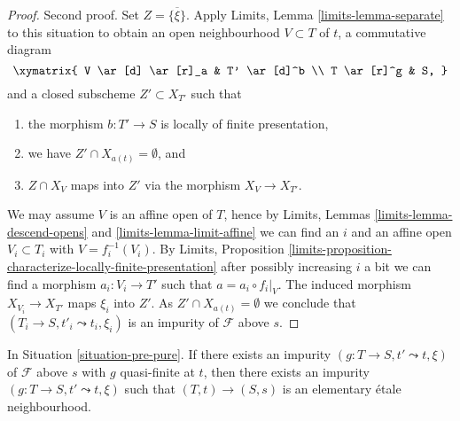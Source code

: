 \begin{proof}
\medskip\noindent
Second proof. Set $Z = \overline{\{\xi\}}$. Apply
Limits, Lemma \ref{limits-lemma-separate}
to this situation to obtain an open neighbourhood
$V \subset T$ of $t$, a commutative diagram
$$
\xymatrix{
V \ar[d] \ar[r]_a & T' \ar[d]^b \\
T \ar[r]^g & S,
}
$$
and a closed subscheme $Z' \subset X_{T'}$ such that
\begin{enumerate}
\item the morphism $b : T' \to S$ is locally of finite presentation,
\item we have $Z' \cap X_{a(t)} = \emptyset$, and
\item $Z \cap X_V$ maps into $Z'$ via the morphism $X_V \to X_{T'}$.
\end{enumerate}
We may assume $V$ is an affine open of $T$, hence by
Limits, Lemmas \ref{limits-lemma-descend-opens} and
\ref{limits-lemma-limit-affine}
we can find an $i$ and an affine open $V_i \subset T_i$ with
$V = f_i^{-1}(V_i)$. By
Limits,
Proposition \ref{limits-proposition-characterize-locally-finite-presentation}
after possibly increasing $i$ a bit we can find a morphism
$a_i : V_i \to T'$ such that $a = a_i \circ f_i|_V$.
The induced morphism $X_{V_i} \to X_{T'}$ maps $\xi_i$ into
$Z'$. As $Z' \cap X_{a(t)} = \emptyset$ we conclude that
$(T_i \to S, t'_i \leadsto t_i, \xi_i)$ is an impurity of
$\mathcal{F}$ above $s$.
\end{proof}

\begin{lemma}
\label{lemma-quasi-finite-impurity-elementary}
In Situation \ref{situation-pre-pure}.
If there exists an impurity $(g : T \to S, t' \leadsto t, \xi)$
of $\mathcal{F}$ above $s$ with $g$ quasi-finite at $t$, then there
exists an impurity $(g : T \to S, t' \leadsto t, \xi)$ such that
$(T, t) \to (S, s)$ is an elementary \'etale neighbourhood.
\end{lemma}


